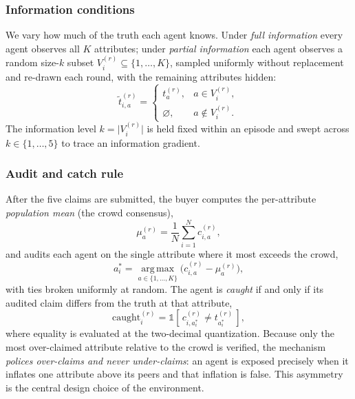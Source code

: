 \subsubsection{Information conditions}
We vary how much of the truth each agent knows. Under \emph{full information}
every agent observes all $K$ attributes; under \emph{partial information} each
agent observes a random size-$k$ subset $V_i^{(r)}\subseteq\{1,\dots,K\}$,
sampled uniformly without replacement and re-drawn each round, with the
remaining attributes hidden:
\begin{equation}
\tilde t_{i,a}^{(r)} =
\begin{cases}
t_a^{(r)}, & a \in V_i^{(r)},\\[2pt]
\varnothing, & a \notin V_i^{(r)}.
\end{cases}
\label{eq:dec-info}
\end{equation}
The information level $k=\lvert V_i^{(r)}\rvert$ is held fixed within an episode
and swept across $k\in\{1,\dots,5\}$ to trace an information gradient.

\subsubsection{Audit and catch rule}
After the five claims are submitted, the buyer computes the per-attribute
\emph{population mean} (the crowd consensus),
\begin{equation}
\mu_a^{(r)} = \frac{1}{N}\sum_{i=1}^{N} c_{i,a}^{(r)},
\label{eq:dec-mu}
\end{equation}
and audits each agent on the single attribute where it most exceeds the crowd,
\begin{equation}
a_i^{*} = \operatorname*{arg\,max}_{a\in\{1,\dots,K\}}\bigl(c_{i,a}^{(r)} - \mu_a^{(r)}\bigr),
\label{eq:dec-audit}
\end{equation}
with ties broken uniformly at random. The agent is \emph{caught} if and only if
its audited claim differs from the truth at that attribute,
\begin{equation}
\mathrm{caught}_i^{(r)} = \mathbb{1}\!\left[\, c_{i,a_i^{*}}^{(r)} \neq t_{a_i^{*}}^{(r)} \,\right],
\label{eq:dec-caught}
\end{equation}
where equality is evaluated at the two-decimal quantization. Because only the
most over-claimed attribute relative to the crowd is verified, the mechanism
\emph{polices over-claims and never under-claims}: an agent is exposed precisely
when it inflates one attribute above its peers and that inflation is false. This
asymmetry is the central design choice of the environment.

